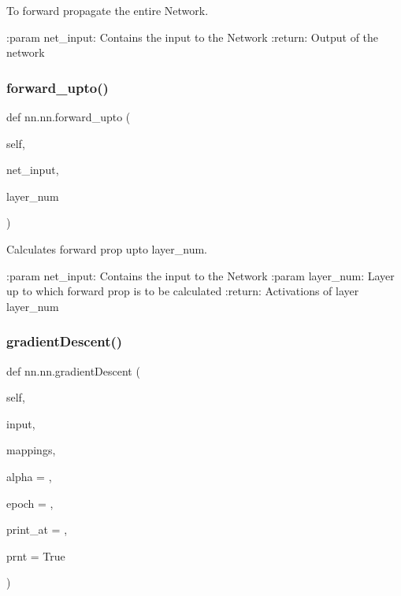 \begin{DoxyVerb}To forward propagate the entire Network.

:param net_input: Contains the input to the Network
:return: Output of the network
\end{DoxyVerb}
 \mbox{\label{classnn_1_1nn_ac3d2b61ed992dc615eacda8e75a61a2b}} 
\subsubsection{\texorpdfstring{forward\+\_\+upto()}{forward\_upto()}}
{\footnotesize\ttfamily def nn.\+nn.\+forward\+\_\+upto (\begin{DoxyParamCaption}\item[{}]{self,  }\item[{}]{net\+\_\+input,  }\item[{}]{layer\+\_\+num }\end{DoxyParamCaption})}

\begin{DoxyVerb}Calculates forward prop upto layer_num.

:param net_input: Contains the input to the Network
:param layer_num: Layer up to which forward prop is to be calculated
:return: Activations of layer layer_num
\end{DoxyVerb}
 \mbox{\label{classnn_1_1nn_a9b8b6d7bc350ef775a61c8c6f82f5501}} 
\subsubsection{\texorpdfstring{gradient\+Descent()}{gradientDescent()}}
{\footnotesize\ttfamily def nn.\+nn.\+gradient\+Descent (\begin{DoxyParamCaption}\item[{}]{self,  }\item[{}]{input,  }\item[{}]{mappings,  }\item[{}]{alpha = {},  }\item[{}]{epoch = {},  }\item[{}]{print\+\_\+at = {},  }\item[{}]{prnt = {\ttfamily True} }\end{DoxyParamCaption})}

